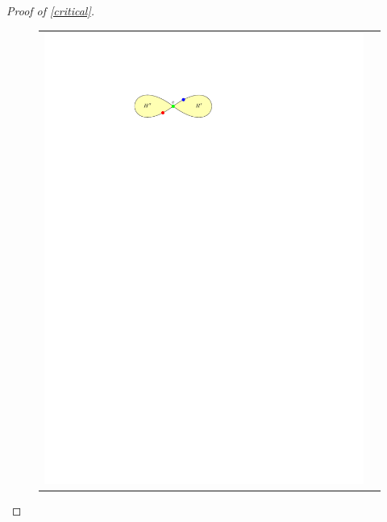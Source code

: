 \documentclass[a4paper,UKenglish,cleveref, autoref, thm-restate]{lipics-v2021}
\begin{document}
\begin{proof}[Proof of \cref{critical}]
  \begin{figure}[htbp]
    \centering
    \begin{tabular}{cc}
      \includegraphics[page=1,trim={30 0 30 0},clip]{figs/critical_3_colouring} &

\end{tabular}
\end{figure}
\end{proof}
\end{document}
